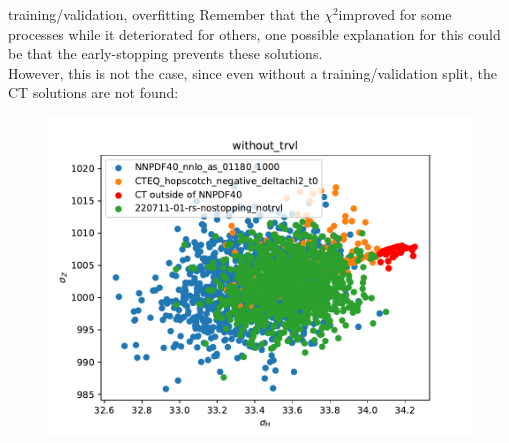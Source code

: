 \documentclass[aspectratio=169,10pt]{beamer}
\newcommand{\chitwo}{$\chi^2$}
\begin{document}
\begin{frame}[t]{training/validation, overfitting}
  Remember that the \chitwo improved for some processes while it deteriorated for others, one possible explanation for this could be that the early-stopping prevents these solutions.\\\vspace*{.5em}
  However, this is not the case, since even without a training/validation split, the CT solutions are not found:
  \begin{figure}
    \centering
    \includegraphics[height=.55\textheight]{without_trvl.pdf}
  \end{figure}
\end{frame}
\end{document}
